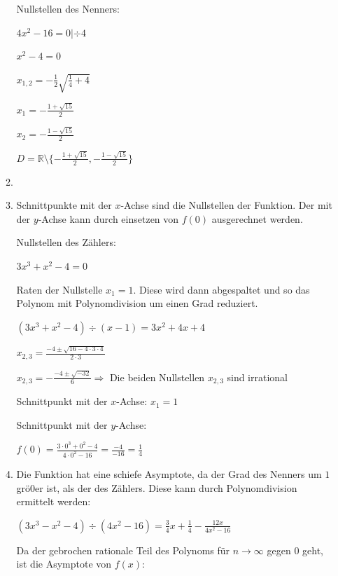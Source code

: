 \documentclass[main.tex]{subfiles}
\begin{document}
\begin{enumerate}
\begin{enumerate}
		            Nullstellen des Nenners:

		            \( 4x^2 - 16 = 0 | \div 4 \)

		            \( x^2 - 4 = 0 \)

		            \( x_{1,2} =- \frac{1}{2} \sqrt{\frac{1}{4} + 4} \)

		            \( x_1 = - \frac{1 + \sqrt{15}}{2} \)

		            \( x_2 = - \frac{1 - \sqrt{15} }{2} \)

		            \( D = \mathbb{R} \setminus \{ -\frac{1 + \sqrt{15}}{2}, -\frac{1 - \sqrt{15}}{2} \} \)
		      \item
		      \item Schnittpunkte mit der \( x \)-Achse sind die Nullstellen der Funktion. Der mit der
		            \( y \)-Achse kann durch einsetzen von \( f(0) \) ausgerechnet werden.

		            Nullstellen des Zählers:

		            \( 3x^3 + x^2 - 4 = 0 \)

		            Raten der Nullstelle \( x_1 = 1 \). Diese wird dann abgespaltet und so das
		            Polynom mit Polynomdivision um einen Grad reduziert.

		            \( (3x^3 + x^2 - 4)\div(x-1) = 3x^2 + 4x + 4 \)

		            \( x_{2,3} = \frac{-4 \pm \sqrt{16 - 4 \cdot 3 \cdot 4}}{2 \cdot 3} \)

		            \( x_{2,3} = - \frac{-4 \pm \sqrt{-32}}{6} \Rightarrow \)
		            Die beiden Nullstellen \( x_{2,3} \) sind irrational

		            Schnittpunkt mit der \( x \)-Achse: \( x_1 = 1 \)

		            Schnittpunkt mit der \( y \)-Achse:

		            \( f(0) = \frac{3\cdot0^3 + 0^2 -4}{4 \cdot 0^2 - 16} = \frac{-4}{-16} = \frac{1}{4} \)
		      \item Die Funktion hat eine schiefe Asymptote, da der Grad des Nenners um \( 1 \) grö0er ist, als der
		            des Zählers. Diese kann durch Polynomdivision ermittelt werden:

		            \( (3x^3 - x^2 - 4) \div (4x^2 - 16) = \frac{3}{4}x + \frac{1}{4} - \frac{12x}{4x^2 - 16} \)

		            Da der gebrochen rationale Teil des Polynoms für \( n \to \infty \) gegen \( 0 \) geht, ist
		            die Asymptote von \( f(x) \):


\end{enumerate}
\end{enumerate}
\end{document}
